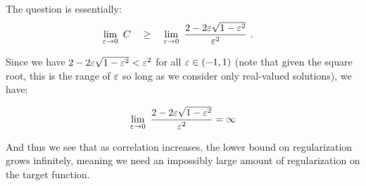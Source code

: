 The question is essentially:
\begin{align*}
  \lim_{\varepsilon \to 0}\ C \quad &\geq\quad  \lim_{\varepsilon \to 0}\ \frac{2 -
  2\varepsilon\sqrt{1 - \varepsilon^2}}{\varepsilon^2}\ .
\end{align*}

Since we have $2 - 2 \varepsilon \sqrt{1 - \varepsilon^2} < \varepsilon^2$ for all $\varepsilon \in (-1, 1)$
(note that given the square root, this is the range of $\varepsilon$ so long as we
consider only real-valued solutions), we have:

\begin{align*}
  \lim_{\varepsilon \to 0}\ \frac{2 - 2\varepsilon\sqrt{1 - \varepsilon^2}}{\varepsilon^2} = \infty
\end{align*}

And thus we see that as correlation increases, the lower bound on regularization
grows infinitely, meaning we need an impossibly large amount of regularization
on the target function.

\sectend
\newpage
